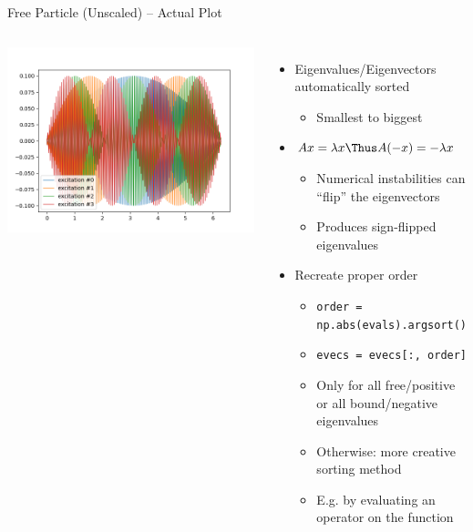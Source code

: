 \begin{frame}{Free Particle (Unscaled) -- Actual Plot}
%
\begin{columns}
\includegraphics[width=\linewidth]{./gfx/04-free-particle-fail}
%
\begin{itemize}
\item Eigenvalues/Eigenvectors automatically sorted
	\begin{itemize}
	\item Smallest to biggest
	\end{itemize}
\item $Ax = \lambda x \Thus A(-x) = -\lambda x$
	\begin{itemize}
	\item Numerical instabilities can \enquote{flip} the eigenvectors
	\item Produces sign-flipped eigenvalues
	\end{itemize}
\item Recreate proper order
	\begin{itemize}
	\item \texttt{order = np.abs(evals).argsort()}
	\item \texttt{evecs = evecs[:, order]}
	\item Only for all free/positive or all bound/negative eigenvalues
	\item Otherwise: more creative sorting method
	\item E.\;g. by evaluating an operator on the function
	\end{itemize}
\end{itemize}
\end{columns}
%
\end{frame}

